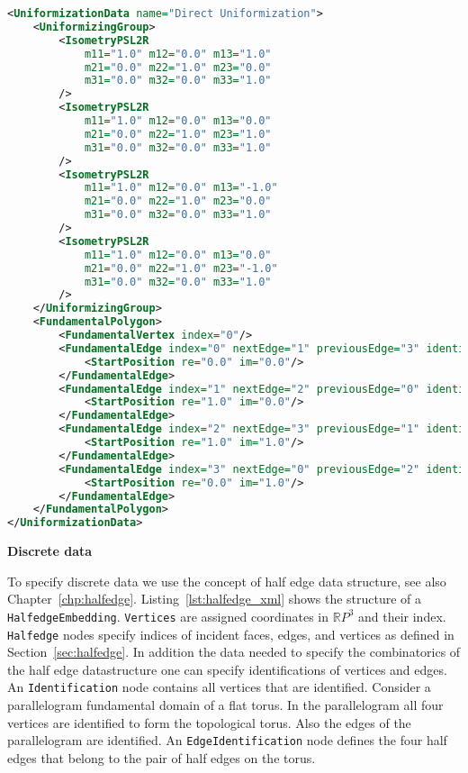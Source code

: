 \documentclass[Thesis.tex]{subfiles}
\begin{document}
\begin{lstlisting}[label=lst:fuchsian_xml, caption={A torus given by its Fuchsian uniformizing group and a corresponding fundamental polygon. The elements of the group are either euclidean motions or hyperbolic motions given as elements of $PSL(2, \mathbb R)$.}, numbers=none, language=XML, captionpos=b]
<UniformizationData name="Direct Uniformization">
	<UniformizingGroup>
		<IsometryPSL2R 
			m11="1.0" m12="0.0" m13="1.0" 
			m21="0.0" m22="1.0" m23="0.0" 
			m31="0.0" m32="0.0" m33="1.0"
		/>
		<IsometryPSL2R 
			m11="1.0" m12="0.0" m13="0.0" 
			m21="0.0" m22="1.0" m23="1.0" 
			m31="0.0" m32="0.0" m33="1.0"
		/>
		<IsometryPSL2R 
			m11="1.0" m12="0.0" m13="-1.0" 
			m21="0.0" m22="1.0" m23="0.0" 
			m31="0.0" m32="0.0" m33="1.0"
		/>
		<IsometryPSL2R 
			m11="1.0" m12="0.0" m13="0.0" 
			m21="0.0" m22="1.0" m23="-1.0" 
			m31="0.0" m32="0.0" m33="1.0"
		/>
	</UniformizingGroup>
	<FundamentalPolygon>
		<FundamentalVertex index="0"/>
		<FundamentalEdge index="0" nextEdge="1" previousEdge="3" identifiedEdge="2" startVertex="0">
			<StartPosition re="0.0" im="0.0"/>
		</FundamentalEdge>
		<FundamentalEdge index="1" nextEdge="2" previousEdge="0" identifiedEdge="3" startVertex="0">
			<StartPosition re="1.0" im="0.0"/>
		</FundamentalEdge>
		<FundamentalEdge index="2" nextEdge="3" previousEdge="1" identifiedEdge="0" startVertex="0">
			<StartPosition re="1.0" im="1.0"/>
		</FundamentalEdge>
		<FundamentalEdge index="3" nextEdge="0" previousEdge="2" identifiedEdge="1" startVertex="0">
			<StartPosition re="0.0" im="1.0"/>
		</FundamentalEdge>
	</FundamentalPolygon>
</UniformizationData>
\end{lstlisting}

{\bf Discrete data} 

To specify discrete data we use the concept of half edge data structure, see also Chapter~\ref{chp:halfedge}. Listing~\ref{lst:halfedge_xml}
shows the structure of a {\tt HalfedgeEmbedding}. {\tt Vertices} are assigned coordinates in $\mathbb RP^3$ and their index. {\tt Halfedge}
nodes specify indices of incident faces, edges, and vertices as defined in Section~\ref{sec:halfedge}. In addition the data needed to specify 
the combinatorics of the half edge datastructure one can specify identifications of vertices and edges. An {\tt Identification} node contains
all vertices that are identified. Consider a parallelogram fundamental domain of a flat torus. In the parallelogram all four vertices are identified
to form the topological torus. Also the edges of the parallelogram are identified. An {\tt EdgeIdentification} node defines the four half edges
that belong to the pair of half edges on the torus.
\end{document}
